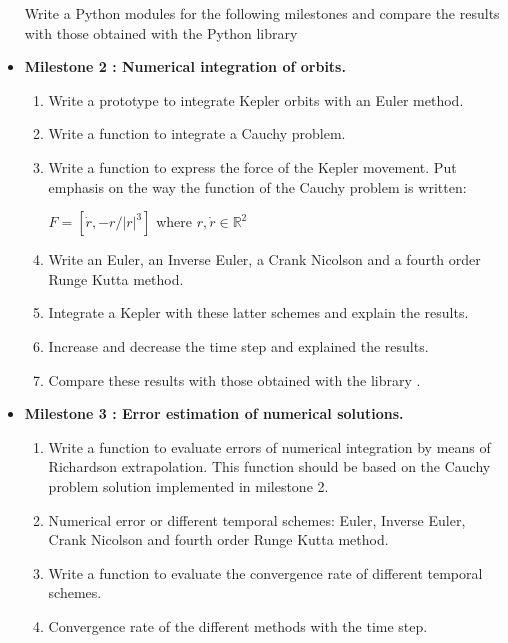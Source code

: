 \documentclass[12pt, a4paper]{article}
\begin{document}
\begin{itemize}
Write a Python modules for the following milestones and compare the results 
with those obtained with the Python library 



\item {\bf Milestone 2 : 
Numerical integration of orbits. } 

\begin{enumerate} 
\item Write a prototype to integrate Kepler orbits with an Euler method. 
\item Write a function to integrate a Cauchy problem.
\item Write a function to express the force of the Kepler movement.
Put emphasis on the way the function of the Cauchy problem is written: 

$ F = [ \dot r , -r/|r|^3 ] $ where $ r, \dot r \in \mathbb{R}^2 $ 

\item Write an Euler, an Inverse Euler, a Crank Nicolson 
and a fourth order Runge Kutta method.  
\item Integrate a Kepler with these latter schemes and explain the results.
\item Increase and decrease the time step and explained the results. 
\item Compare  these results with those  obtained with the library  .  
\end{enumerate} 


\newpage
\item {\bf Milestone 3 : Error estimation of numerical solutions.} 


\begin{enumerate}

\item Write a function to evaluate errors of numerical integration by means of Richardson 
extrapolation. 
This function should be based on the Cauchy problem solution implemented in milestone 2. 
\item Numerical error or different temporal schemes:  
Euler, Inverse Euler, Crank Nicolson 
and  fourth order Runge Kutta method.  
\item Write a function to evaluate the convergence rate of different temporal schemes. 
\item Convergence rate of the different methods with the time step.   


\end{enumerate}
\end{itemize}
\end{document}
